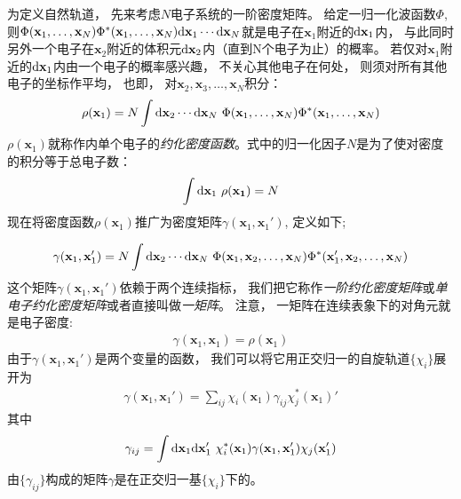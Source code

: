 为定义自然轨道，
先来考虑$N$电子系统的一阶密度矩阵。
给定一归一化波函数$\Phi$, 
则$\Phi(\mathbf{x}_1,\ldots,\mathbf{x}_N)\Phi^*(\mathbf{x}_1,\ldots,\mathbf{x}_N)\ddx_1\cdots\ddx_N$就是电子在$\mathbf{x}_1$附近的$\ddx_1$内，
与此同时另外一个电子在$\mathbf{x}_2$附近的体积元$\ddx_2$内（直到N个电子为止）的概率。
若仅对$\mathbf{x}_1$附近的$\ddx_1$内由一个电子的概率感兴趣，
不关心其他电子在何处，
则须对所有其他电子的坐标作平均，
也即，
对$\mathbf{x}_2,\mathbf{x}_3,\ldots,\mathbf{x}_N$积分：
\begin{align}
\rho(\mathbf{x}_1) = N \int\ddx_2\cdots\ddx_N \,\, \Phi(\mathbf{x}_1,\ldots,\mathbf{x}_N)\Phi^*(\mathbf{x}_1,\ldots,\mathbf{x}_N)
\end{align}
$\rho(\mathbf{x}_1)$就称作内单个电子的\emph{约化密度函数}。式中的归一化因子$N$是为了使对密度的积分等于总电子数：
\begin{align}
\int\ddx_1\,\,\rho(\mathbf{x_1}) = N
\end{align}
现在将密度函数$\rho(\mathbf{x}_1)$推广为密度矩阵$\gamma(\mathbf{x}_1,\mathbf{x}_1')$, 
定义如下;

\begin{align}
\label{4.35}
\gamma(\mathbf{x}_1,\mathbf{x}_1') = N \int\ddx_2\cdots\ddx_N \,\, \Phi(\mathbf{x}_1,\mathbf{x}_2,\ldots,\mathbf{x}_N)\Phi^*(\mathbf{x}_1',\mathbf{x}_2,\ldots,\mathbf{x}_N)
\end{align}
这个矩阵$\gamma(\mathbf{x}_1,\mathbf{x}_1')$依赖于两个连续指标，
我们把它称作\emph{一阶约化密度矩阵}或\emph{单电子约化密度矩阵}或者直接叫做\emph{一矩阵}。
注意，
一矩阵在连续表象下的对角元就是电子密度:
\begin{align}
\gamma(\mathbf{x}_1,\mathbf{x}_1) = \rho(\mathbf{x}_1)
\end{align}
由于$\gamma(\mathbf{x}_1,\mathbf{x}_1')$是两个变量的函数，
我们可以将它用正交归一的\hft 自旋轨道$\{\chi_i\}$展开为
\begin{align}
\gamma(\mathbf{x}_1,\mathbf{x}_1') = \sum_{ij} \chi_i(\mathbf{x}_1) \gamma_{ij} \chi_j^*(\mathbf{x}_1)'
\label{4.37}
\end{align}
其中
\begin{align}
\gamma_{ij} = \int\ddx_1\ddx_1'\,\,\chi_i^*(\mathbf{x}_1)\gamma(\mathbf{x}_1,\mathbf{x}_1')\chi_j(\mathbf{x}_1')
\end{align}
由$\{\gamma_{ij}\}$构成的矩阵$\gamma$是在正交归一基$\{\chi_i\}$下的。


